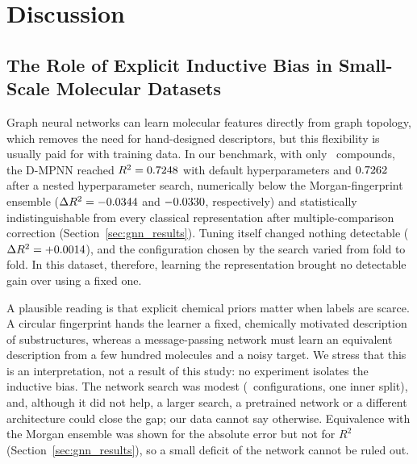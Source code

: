 \section{Discussion}


\subsection{The Role of Explicit Inductive Bias in Small-Scale Molecular Datasets}

Graph neural networks can learn molecular features directly from graph topology, which removes the need for hand-designed descriptors, but this flexibility is usually paid for with training data. In our benchmark, with only \NCompounds\ compounds, the D-MPNN reached $R^2 = 0.7248$ with default hyperparameters and $0.7262$ after a nested hyperparameter search, numerically below the Morgan-fingerprint ensemble ($\Delta R^2 = -0.0344$ and $-0.0330$, respectively) and statistically indistinguishable from every classical representation after multiple-comparison correction (Section~\ref{sec:gnn_results}). Tuning itself changed nothing detectable ($\Delta R^2 = +0.0014$), and the configuration chosen by the search varied from fold to fold. In this dataset, therefore, learning the representation brought no detectable gain over using a fixed one.

A plausible reading is that explicit chemical priors matter when labels are scarce. A circular fingerprint hands the learner a fixed, chemically motivated description of substructures, whereas a message-passing network must learn an equivalent description from a few hundred molecules and a noisy target. We stress that this is an interpretation, not a result of this study: no experiment isolates the inductive bias. The network search was modest (\GnnTunedNConfigs\ configurations, one inner split), and, although it did not help, a larger search, a pretrained network or a different architecture could close the gap; our data cannot say otherwise. Equivalence with the Morgan ensemble was shown for the absolute error but not for $R^2$ (Section~\ref{sec:gnn_results}), so a small deficit of the network cannot be ruled out.

